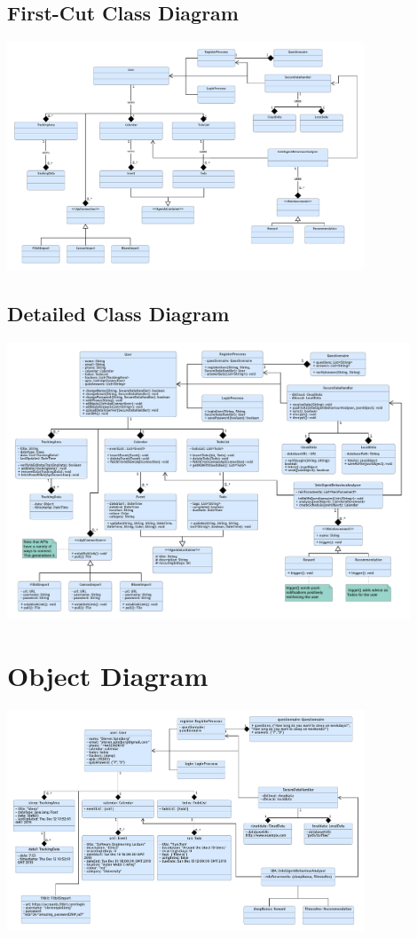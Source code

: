 \documentclass[a4paper,11pt]{article} %
\begin{document}
\subsection{First-Cut Class Diagram}
\begin{center}
\includegraphics[angle=-90,width=0.8\textwidth]{img/Firstcut_Class_Diagram.pdf}
\end{center}
\subsection{Detailed Class Diagram}
\begin{center}
\includegraphics[angle=-90,width=0.9\textwidth]{img/Class_Diagram.pdf}
\end{center}
\newpage

\section{Object Diagram}
\begin{center}
    \includegraphics[angle=-90,width=0.8\textwidth]{img/Object_Diagram.pdf}
\end{center}
\newpage
\end{document}
